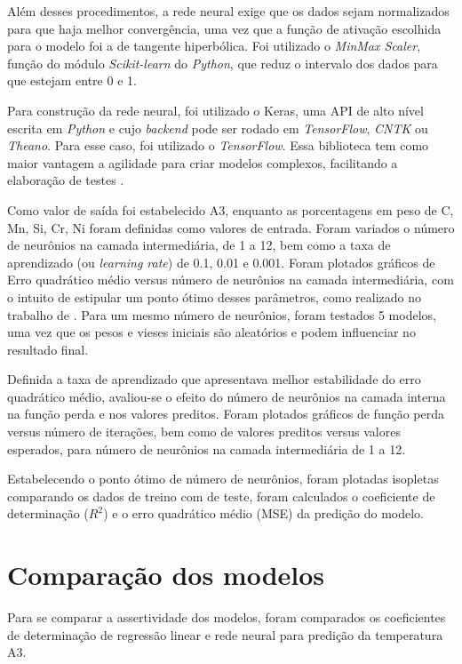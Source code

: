 \documentclass[brazil,tf,epusp]{usp}  %
\begin{document}
Além desses procedimentos, a rede neural exige que os dados sejam normalizados para que haja melhor convergência, uma vez que a função de ativação escolhida para o modelo foi a de tangente hiperbólica. Foi utilizado o \textit{MinMax Scaler}, função do módulo \textit{Scikit-learn} do \textit{Python}, que reduz o intervalo dos dados para que estejam entre 0 e 1.

Para construção da rede neural, foi utilizado o Keras, uma API de alto nível escrita em \textit{Python} e cujo
\textit{backend} pode ser rodado em \textit{TensorFlow}, \textit{CNTK} ou \textit{Theano}. Para esse caso, foi utilizado o \textit{TensorFlow}. Essa biblioteca tem como maior vantagem a agilidade para criar modelos complexos, facilitando a elaboração de testes \cite{Skalski2017}.

Como valor de saída foi estabelecido A3, enquanto as porcentagens em peso de C, Mn, Si, Cr, Ni foram definidas como valores de entrada. Foram variados o número de neurônios na camada intermediária, de 1 a 12, bem como a taxa de aprendizado (ou \textit{learning rate}) de 0.1, 0.01 e 0.001. Foram plotados gráficos de Erro quadrático médio versus número de neurônios na camada intermediária, com o intuito de estipular um ponto ótimo desses parâmetros, como realizado no trabalho de . Para um mesmo número de neurônios, foram testados 5 modelos, uma vez que os pesos e vieses iniciais são aleatórios e podem influenciar no resultado final.

Definida a taxa de aprendizado que apresentava melhor estabilidade do erro quadrático médio, avaliou-se o efeito do número de neurônios na camada interna na função perda e nos valores preditos. Foram plotados gráficos de função perda versus número de iterações, bem como de valores preditos versus valores esperados, para número de neurônios na camada intermediária de 1 a 12.

Estabelecendo o ponto ótimo de número de neurônios, foram plotadas isopletas comparando os dados de treino com de teste, foram calculados o coeficiente de determinação ($R^{2}$) e o erro quadrático médio (MSE) da predição do modelo.

\section{Comparação dos modelos}

Para se comparar a assertividade dos modelos, foram comparados os coeficientes de determinação de regressão linear e rede neural para predição da temperatura A3.
\end{document}

